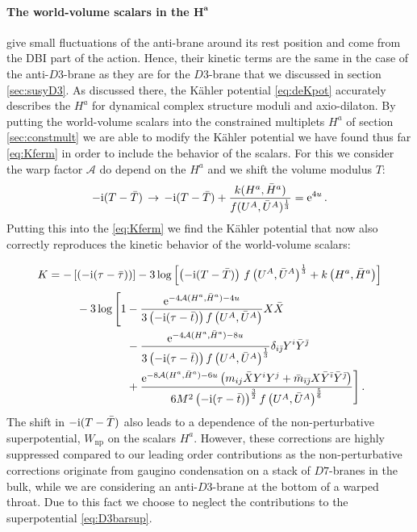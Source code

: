 \documentclass[a4paper,12pt,twoside,openright]{report}
\newcommand{\be}{\begin{equation}}
\newcommand{\ee}{\end{equation}}
\newcommand{\bea}{\begin{equation}\begin{aligned}}
\newcommand{\eea}{\end{aligned}\end{equation}}
\def\rmi{{\rm i}}
\def\rme{{\rm e}}
\def\ib{{\bar \imath}}
\def\jb{{\bar \jmath}}
\begin{document}
\paragraph{The world-volume scalars in the $\mathbf{H^a}$} give small fluctuations of the anti-brane around its rest position and come from the DBI part of the action. Hence, their kinetic terms are the same in the case of the anti-$D3$-brane as they are for the $D3$-brane that we discussed in section \ref{sec:susyD3}. As discussed there, the Kähler potential \eqref{eq:deKpot} accurately describes the $H^a$ for dynamical complex structure moduli and axio-dilaton. By putting the world-volume scalars into the constrained multiplets $H^a$ of section \ref{sec:constmult} we are able to modify the Kähler potential we have found thus far \eqref{eq:Kferm} in order to include the behavior of the scalars. For this we consider the warp factor $\mathcal{A}$ do depend on the $H^a$ and we shift the volume modulus $T$:
\be 
-\rmi (T-\bar{T}) \,\to \, -\rmi(T-\bar{{T}}) + \frac{k(H^a,\bar{H}^a)}{f(U^A,\bar{U}^A)^{\frac{1}{3}}}=\rme^{4u}\,.
\ee
Putting this into the \eqref{eq:Kferm} we find the Kähler potential that now also correctly reproduces the kinetic behavior of the world-volume scalars:

\[
K = -\left[\left(-\rmi(\tau-\bar{\tau})\right)\right]-3 \log \left[\left(-\rmi(T-\bar{T})\right)\,f\left(U^A,\bar{U}^A\right)^{\frac{1}{3}}+k\left(H^a,\bar{H}^a\right)\right]
\]
\bea 
\qquad&- 3 \log\Bigg[1-\frac{\rme^{-4\mathcal{A}(H^a,\bar{H}^a)-4u}}{3\left(-\rmi(\tau-\bar{t})\right)f\left(U^A,\bar{U}^A\right)}X\bar{X}\\
&\qquad\qquad\;\,-\frac{\rme^{-4\mathcal{A}(H^a,\bar{H}^a)-8u}}{3\left(-\rmi(\tau-\bar{t})\right)f\left(U^A,\bar{U}^A\right)^{\frac{1}{3}}}\delta_{i\jb}Y^i\bar{Y}^\jb\\
&\qquad\qquad\;\,+\frac{\rme^{-8\mathcal{A}(H^a,\bar{H}^a)-6u}\left(m_{ij}\bar{X}Y^iY^j+\bar{m}_{\ib\jb}X \bar{Y}^\ib\bar{Y}^\jb\right)}{6 M^2 \left(-\rmi(\tau-\bar{t})\right)^{\frac{3}{2}}f\left(U^A,\bar{U}^A\right)^{\frac{5}{6}}}\Bigg]\,.
\label{eq:KpotbarD3}
\eea
The shift in $-\rmi (T-\bar{T})$ also leads to a dependence of the non-perturbative superpotential, $W_{\text{np}}$ on the scalars $H^a$. However, these corrections are highly suppressed compared to our leading order contributions as the non-perturbative corrections originate from gaugino condensation on a stack of $D7$-branes in the bulk, while we are considering an anti-$D3$-brane at the bottom of a warped throat. Due to this fact we choose to neglect the contributions to the superpotential \eqref{eq:D3barsup}.
\end{document}
